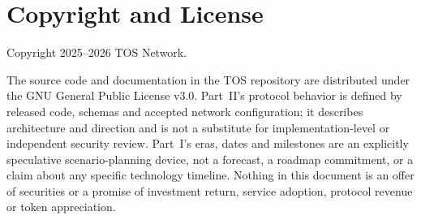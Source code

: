 \documentclass[11pt,oneside]{article}
\begin{document}
\section*{Copyright and License}

Copyright \textcopyright{} 2025--2026 TOS Network.

The source code and documentation in the TOS repository are distributed under the GNU General
Public License v3.0. Part~II's protocol behavior is defined by released code, schemas and
accepted network configuration; it describes architecture and direction and is not a
substitute for implementation-level or independent security review. Part~I's eras, dates and
milestones are an explicitly speculative scenario-planning device, not a forecast, a roadmap
commitment, or a claim about any specific technology timeline. Nothing in this document is an
offer of securities or a promise of investment return, service adoption, protocol revenue or
token appreciation.
\end{document}
